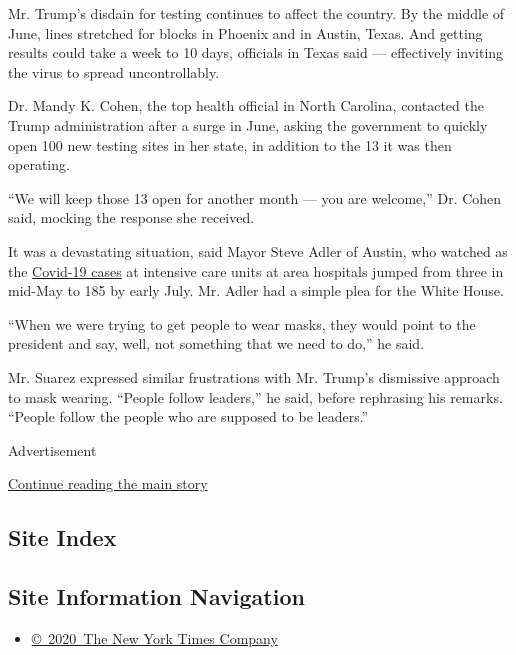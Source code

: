 Mr. Trump's disdain for testing continues to affect the country. By the
middle of June, lines stretched for blocks in Phoenix and in Austin,
Texas. And getting results could take a week to 10 days, officials in
Texas said --- effectively inviting the virus to spread uncontrollably.

Dr. Mandy K. Cohen, the top health official in North Carolina, contacted
the Trump administration after a surge in June, asking the government to
quickly open 100 new testing sites in her state, in addition to the 13
it was then operating.

``We will keep those 13 open for another month --- you are welcome,''
Dr. Cohen said, mocking the response she received.

It was a devastating situation, said Mayor Steve Adler of Austin, who
watched as the
\href{https://dshs.texas.gov/coronavirus/additionaldata.aspx}{Covid-19
cases} at intensive care units at area hospitals jumped from three in
mid-May to 185 by early July. Mr. Adler had a simple plea for the White
House.

``When we were trying to get people to wear masks, they would point to
the president and say, well, not something that we need to do,'' he
said.

Mr. Suarez expressed similar frustrations with Mr. Trump's dismissive
approach to mask wearing. ``People follow leaders,'' he said, before
rephrasing his remarks. ``People follow the people who are supposed to
be leaders.''

Advertisement

\protect\hyperlink{after-bottom}{Continue reading the main story}

\hypertarget{site-index}{%
\subsection{Site Index}\label{site-index}}

\hypertarget{site-information-navigation}{%
\subsection{Site Information
Navigation}\label{site-information-navigation}}

\begin{itemize}
\tightlist
\item
  \href{https://help.nytimes.com/hc/en-us/articles/115014792127-Copyright-notice}{©~2020~The
  New York Times Company}
\end{itemize}

